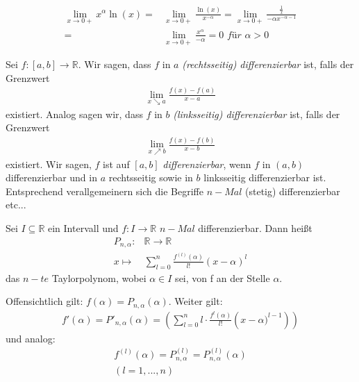 \begin{Beispiel}{
	\begin{align*}
		\lim\limits_{x \rightarrow 0+}{x^{\alpha} \ln(x)} = &
		\lim\limits_{x \rightarrow 0+}{\frac{\ln(x)}{x^{- \alpha}}}
		= \lim\limits_{x \rightarrow 0+}{\frac{\frac{1}{x}}{-\alpha x^{-\alpha-1}}}
		\\ = & \lim\limits_{x \rightarrow 0+}{\frac{x^{\alpha}}{-\alpha}}
		= 0 \textit{ für } \alpha > 0 
	\end{align*}
}\end{Beispiel}

\begin{Definition}{
	Sei $f: [a,b] \rightarrow \mathbb{R}$. Wir sagen, dass $f$ in $a$ 
	\textit{(rechtsseitig) differenzierbar} ist, falls der Grenzwert
	\begin{align*}
		\lim\limits_{x \searrow a}{\frac{f(x)-f(a)}{x-a}}
	\end{align*}
	existiert.
	Analog sagen wir, dass $f$ in $b$ \textit{(linksseitig) differenzierbar} ist, 
	falls der Grenzwert 
	\begin{align*}
		\lim\limits_{x \nearrow b}{\frac{f(x)-f(b)}{x-b}}
	\end{align*}
	existiert. Wir sagen, $f$ ist auf $[a,b]$ \textit{differenzierbar}, wenn $f$ in 
	$(a,b)$ differenzierbar und in $a$ rechtsseitig sowie in $b$ linksseitig 
	differenzierbar ist. Entsprechend verallgemeinern sich die Begriffe $n-Mal$
	(stetig) differenzierbar etc...
	
}\end{Definition}

\begin{Definition}{
	Sei $I \subseteq \mathbb{R}$ ein Intervall und $f : I \rightarrow \mathbb{R}$ 
	$n-Mal$ differenzierbar. Dann heißt 
	\begin{align*}
		P_{n, \alpha} : & \mathbb{R} \rightarrow \mathbb{R} \\
		x \mapsto & \sum_{l = 0}^n \frac{f^{(l)}(\alpha)}{l !} (x - \alpha)^l
	\end{align*}
	das $n-te$ Taylorpolynom, wobei $\alpha \in I$ sei, von f an der Stelle 
	$\alpha$.
}\end{Definition}

\begin{Bemerkung}{
	Offensichtlich gilt: 
	$f(\alpha) = P_{n, \alpha} ( \alpha)$. Weiter gilt: 
	\begin{align*}
		f'(\alpha) = P'_{n, \alpha}(\alpha) = \left( \sum_{l = 0}^n l 
		\cdot \frac{f^l (\alpha)}{l!} \left( x  - \alpha) ^{l-1} \right) \right)
	\end{align*}
	und analog: 
	\begin{align*}
		f^{(l)} (\alpha) = P_{n, \alpha}^{(l)} = P_{n, \alpha}^{(l)} (\alpha) \\
		( l = 1, ..., n)
	\end{align*}
}\end{Bemerkung}

